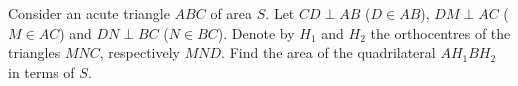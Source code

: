 Consider an acute triangle $ABC$ of area $S$. Let $CD \perp AB$ ($D \in AB$),  $DM \perp AC$ ($M \in AC$) and $DN \perp BC$ ($N \in BC$). Denote by $H_1$ and $H_2$ the orthocentres of the triangles $MNC$, respectively $MND$. Find the area of the quadrilateral $AH_1BH_2$ in terms of $S$.